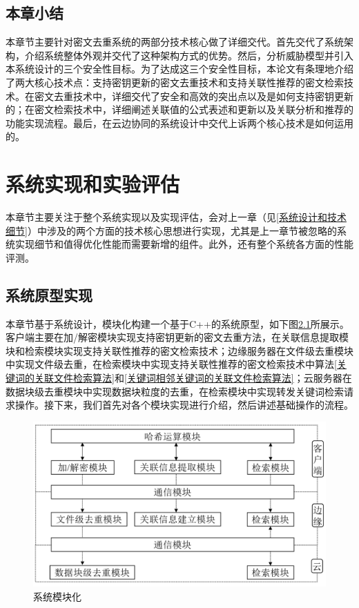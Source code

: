 \documentclass[promaster]{thesis-uestc}
\begin{document}
\section{本章小结}
本章节主要针对密文去重系统的两部分技术核心做了详细交代。首先交代了系统架构，介绍系统整体外观并交代了这种架构方式的优势。然后，分析威胁模型并引入本系统设计的三个安全性目标。为了达成这三个安全性目标，本论文有条理地介绍了两大核心技术点：支持密钥更新的密文去重技术和支持关联性推荐的密文检索技术。在密文去重技术中，详细交代了安全和高效的突出点以及是如何支持密钥更新的；在密文检索技术中，详细阐述关联值的公式表述和更新以及关联分析和推荐的功能实现流程。最后，在云边协同的系统设计中交代上诉两个核心技术是如何运用的。
\chapter{系统实现和实验评估}
本章节主要关注于整个系统实现以及实现评估，会对上一章（见\ref{系统设计和技术细节}）中涉及的两个方面的技术核心思想进行实现，尤其是上一章节被忽略的系统实现细节和值得优化性能而需要新增的组件。此外，还有整个系统各方面的性能评测。

\section{系统原型实现}

本章节基于系统设计，模块化构建一个基于C++的系统原型，如下图\ref{模块关系}所展示。客户端主要在加/解密模块实现支持密钥更新的密文去重方法，在关联信息提取模块和检索模块实现支持关联性推荐的密文检索技术；边缘服务器在文件级去重模块中实现文件级去重，在检索模块中实现支持关联性推荐的密文检索技术中算法\ref{关键词的关联文件检索算法}和\ref{关键词相邻关键词的关联文件检索算法}；云服务器在数据块级去重模块中实现数据块粒度的去重，在检索模块中实现转发关键词检索请求操作。接下来，我们首先对各个模块实现进行介绍，然后讲述基础操作的流程。

\begin{figure}[htbp]
    \centering
    \includegraphics[width = 0.8\linewidth]{pic/系统模块化实现.png}
    \caption{系统模块化}
    \label{模块关系}
\end{figure}
\end{document}
